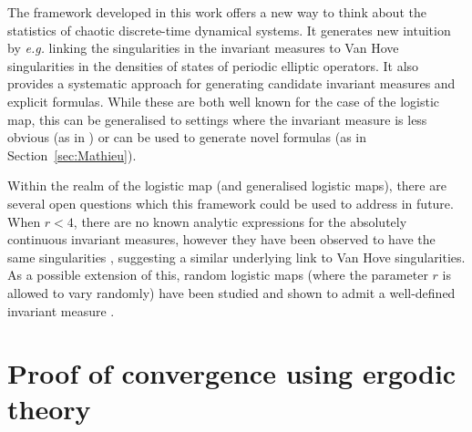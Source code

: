 \documentclass[a4paper]{article}
\theoremstyle{definition}
\numberwithin{equation}{section}
\numberwithin{theorem}{section}
\begin{document}
{The framework developed in this work offers a new way to think about the statistics of chaotic discrete-time dynamical systems. It generates new intuition by \emph{e.g.} linking the singularities in the invariant measures to Van Hove singularities in the densities of states of periodic elliptic operators. It also provides a systematic approach for generating candidate invariant measures and explicit formulas. While these are both well known for the case of the logistic map, this can be generalised to settings where the invariant measure is less obvious (as in \cite{davies2024vanhove}) or can be used to generate novel formulas (as in Section~\ref{sec:Mathieu}).

Within the realm of the logistic map (and generalised logistic maps), there are several open questions which this framework could be used to address in future. When $r<4$, there are no known analytic expressions for the absolutely continuous invariant measures, however they have been observed to have the same singularities \cite{hall2018properties, diaz-ruelas2021logistic}, suggesting a similar underlying link to Van Hove singularities. As a possible extension of this, random logistic maps (where the parameter $r$ is allowed to vary randomly) have been studied and shown to admit a well-defined invariant measure \cite{bhattacharya2004stability, ayers2024noisy, athreya2000random}.







\appendix
\section{Proof of convergence using ergodic theory} \label{app:ergodic}

}
\end{document}
